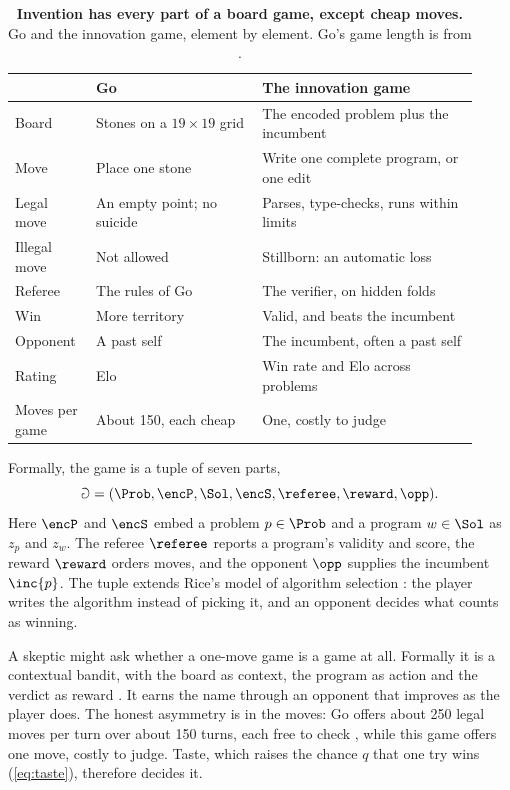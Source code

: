 \begin{table}[htb]
  \caption{\textbf{Invention has every part of a board game, except cheap
  moves.} Go and the innovation game, element by element. Go's game length is
  from \citet{silver2016mastering}.}
  \label{tab:go-vs-innovation}
  \centering
  \small
  \begin{tabular}{@{}p{0.16\linewidth}p{0.33\linewidth}p{0.43\linewidth}@{}}
    \toprule
                   & Go                              & The innovation game \\
    \midrule
    Board          & Stones on a $19\times19$ grid   & The encoded problem plus the incumbent \\
    Move           & Place one stone                 & Write one complete program, or one edit \\
    Legal move     & An empty point; no suicide      & Parses, type-checks, runs within limits \\
    Illegal move   & Not allowed                     & Stillborn: an automatic loss \\
    Referee        & The rules of Go                 & The verifier, on hidden folds \\
    Win            & More territory                  & Valid, and beats the incumbent \\
    Opponent       & A past self                     & The incumbent, often a past self \\
    Rating         & Elo                             & Win rate and Elo across problems \\
    Moves per game & About 150, each cheap           & One, costly to judge \\
    \bottomrule
  \end{tabular}
\end{table}

Formally, the game is a tuple of seven parts,
\[
  \Game = (\Prob, \encP, \Sol, \encS, \referee, \reward, \opp).
\]
Here $\encP$ and $\encS$ embed a problem $p \in \Prob$ and a program
$w \in \Sol$ as $z_p$ and $z_w$. The referee $\referee$ reports a program's
validity and score, the reward $\reward$ orders moves, and the opponent $\opp$
supplies the incumbent $\inc{p}$. The tuple extends Rice's model of algorithm
selection \citep{rice1976algorithm}: the player writes the algorithm instead of
picking it, and an opponent decides what counts as winning.

A skeptic might ask whether a one-move game is a game at all. Formally it is a
contextual bandit, with the board as context, the program as action and the
verdict as reward \citep{lattimore2020bandit}. It earns the name through an
opponent that improves as the player does. The honest asymmetry is in the
moves: Go offers about 250 legal moves per turn over about 150 turns, each free
to check \citep{silver2016mastering}, while this game offers one move, costly to
judge. Taste, which raises the chance $q$ that one try wins (\cref{eq:taste}),
therefore decides it.

